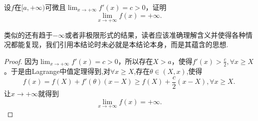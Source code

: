 \documentclass[../../main.tex]{subfiles}
\begin{document}
\begin{proposition}[导数有正增长率则函数爆炸]\label{proposition:导数有正增长率则函数爆炸}
设\(f\)在\([a,+\infty)\)可微且\(\lim_{x\rightarrow +\infty}f'(x)=c > 0\)，证明
\[\lim_{x\rightarrow +\infty}f(x)=+\infty.\]
\end{proposition}
\begin{note}
类似的还有趋于\(-\infty\)或者非极限形式的结果，读者应该准确理解含义并使得各种情况都能复现，我们引用本结论时未必就是本结论本身，而是其蕴含的思想.
\end{note}
\begin{proof}
因为\(\lim_{x\rightarrow +\infty}f'(x)=c > 0\)，所以存在\(X > a\)，使得\(f'(x)>\frac{c}{2},\forall x\geqslant X\)。于是由Lagrange中值定理得到,对$\forall x\geqslant X$,存在$\theta \in (X,x)$,使得
\[f(x)=f(X)+f'(\theta)(x - X)\geqslant f(X)+\frac{c}{2}(x - X),\forall x\geqslant X.\]
让\(x\rightarrow +\infty\)就得到
\[\lim_{x\rightarrow +\infty}f(x)=+\infty.\]
\end{proof}
\end{document}
